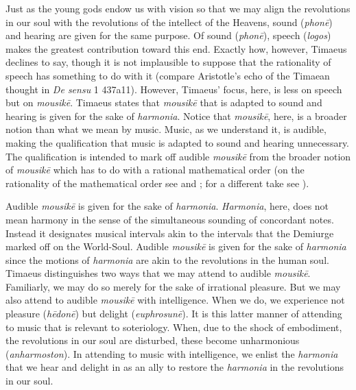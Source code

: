 Just as the young gods endow us with vision so that we may align the revolutions in our soul with the revolutions of the intellect of the Heavens, sound (\emph{phonē}) and hearing are given for the same purpose. Of sound (\emph{phonē}), speech (\emph{logos}) makes the greatest contribution toward this end. Exactly how, however, Timaeus declines to say, though it is not implausible to suppose that the rationality of speech has something to do with it (compare Aristotle's echo of the Timaean thought in \emph{De sensu} 1 437a11). However, Timaeus' focus, here, is less on speech but on \emph{mousikē}. Timaeus states that \emph{mousikē} that is adapted to sound and hearing is given for the sake of \emph{harmonia}. Notice that \emph{mousikē}, here, is a broader notion than what we mean by music. Music, as we understand it, is audible, making the qualification that music is adapted to sound and hearing unnecessary. The qualification is intended to mark off audible \emph{mousikē} from the broader notion of \emph{mousikē} which has to do with a rational mathematical order (on the rationality of the mathematical order see \citealt{Burnyeat:1987ix} and \citealt{Barker:1994mq}; for a different take see \citealt[295--6]{Taylor:1928qb}). 

Audible \emph{mousikē} is given for the sake of \emph{harmonia}. \emph{Harmonia}, here, does not mean harmony in the sense of the simultaneous sounding of concordant notes. Instead it designates musical intervals akin to the intervals that the Demiurge marked off on the World-Soul. Audible \emph{mousikē} is given for the sake of \emph{harmonia} since the motions of \emph{harmonia} are akin to the revolutions in the human soul. Timaeus distinguishes two ways that we may attend to audible \emph{mousikē}. Familiarly, we may do so merely for the sake of irrational pleasure. But we may also attend to audible \emph{mousikē} with intelligence. When we do, we experience not pleasure (\emph{hēdonē}) but delight (\emph{euphrosunē}). It is this latter manner of attending to music that is relevant to soteriology. When, due to the shock of embodiment, the revolutions in our soul are disturbed, these become unharmonious (\emph{anharmoston}). In attending to music with intelligence, we enlist the \emph{harmonia} that we hear and delight in as an ally to restore the \emph{harmonia} in the revolutions in our soul.

